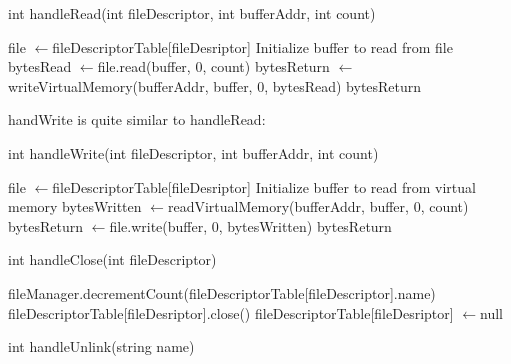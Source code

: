 \documentclass{article}
\renewcommand{\gets}{%
  \ensuremath{\leftarrow}}
\begin{document}
\begin{spacing}{1.1}
\begin{algorithm}
  \caption{int \textsf{handleRead}(int fileDescriptor, int bufferAddr, int count)}

  {
    \;
  }
   file \gets \textsf{fileDescriptorTable}[fileDesriptor]\;
   {
    \;
  }
   Initialize buffer to read from file\;
   bytesRead \gets file.\textsf{read}(buffer, 0, count)\;
   {
    \;
  }{
     bytesReturn \gets \textsf{writeVirtualMemory(bufferAddr, buffer, 0, bytesRead)}\;
    \Return bytesReturn\;
  }

\end{algorithm}

\textsf{handWrite} is quite similar to \textsf{handleRead}:

\begin{algorithm}
  \caption{int \textsf{handleWrite}(int fileDescriptor, int bufferAddr, int count)}

  {
    \;
  }
   file \gets \textsf{fileDescriptorTable}[fileDesriptor]\;
   {
    \;
  }
   Initialize buffer to read from virtual memory\;
   bytesWritten \gets \textsf{readVirtualMemory}(bufferAddr, buffer, 0, count)\;
   {
    \;
  }
   bytesReturn \gets file.\textsf{write}(buffer, 0, bytesWritten)\;
   {
    \;
  }
  \Return bytesReturn\;

\end{algorithm}

\begin{algorithm}
  \caption{int \textsf{handleClose}(int fileDescriptor)}

  {
    \;
  }
   fileManager.decrementCount(fileDescriptorTable[fileDescriptor].name)\;
   fileDescriptorTable[fileDesriptor].close()\;
   fileDescriptorTable[fileDesriptor] \gets null\;
  \;
\end{algorithm}

\begin{algorithm}
  \caption{int \textsf{handleUnlink}(string name)}
  {
    \;
  }
  \;
\end{algorithm}


\end{spacing}
\end{document}

